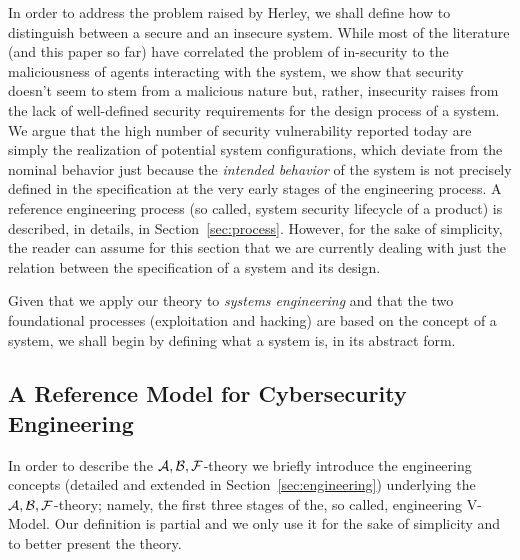 

In order to address the problem raised by Herley, 
we shall define how to distinguish between a secure and an insecure system.
While most of the literature (and this paper so far) have
correlated the problem of in-security to the maliciousness of
agents interacting with the system, we show that security
doesn't seem to stem from a malicious nature but, rather, insecurity 
raises from the lack of well-defined security requirements for the
design process of a system. We argue that the high number
of security vulnerability reported today are simply the realization
of potential system configurations, which deviate from the nominal
behavior just because the \emph{intended behavior} of the system is not precisely 
defined in the specification at the very early stages of the engineering process. 
A reference engineering process (so called, system security lifecycle of a product)
is described, in details, in Section~\ref{sec:process}. However,
for the sake of simplicity, the reader can assume for this section that 
we are currently dealing with just the relation between 
the specification of a system and its design.

Given that we apply our theory to \emph{systems engineering} and that
the two foundational processes (exploitation and hacking) are based on the
concept of a system, we shall begin by defining what a system is, in its
abstract form.


\subsection{A Reference Model for Cybersecurity Engineering}\label{sec:vmodel}
In order to describe the $\mathcal{A},\mathcal{B},\mathcal{F}$-theory we briefly introduce the 
engineering concepts (detailed and extended in Section~\ref{sec:engineering})
underlying the $\mathcal{A},\mathcal{B},\mathcal{F}$-theory; namely, the first three stages of the, so called,
engineering V-Model. Our definition is partial and we only use it for the 
sake of simplicity and to better present the theory.


